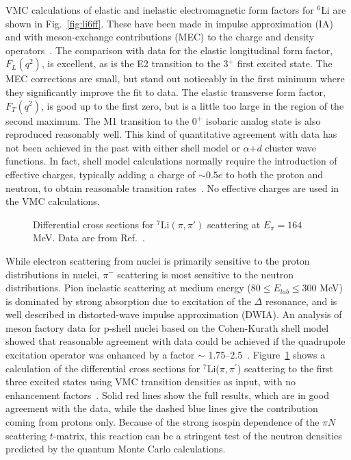 VMC calculations of elastic and inelastic electromagnetic form
factors for $^6$Li are shown in Fig.~\ref{fig:li6ff}.
These have been made in impulse approximation (IA) and with meson-exchange
contributions (MEC) to the charge and density operators~\cite{WS98}.
The comparison with data for the elastic longitudinal form factor, $F_L(q^2)$,
is excellent, as is the E2 transition to the 3$^+$ first excited state.
The MEC corrections are small, but stand out noticeably in the first minimum
where they significantly improve the fit to data.
The elastic transverse form factor, $F_T(q^2)$, is good up to the first zero,
but is a little too large in the region of the second maximum.
The M1 transition to the 0$^+$ isobaric analog state is also reproduced
reasonably well.
This kind of quantitative agreement with data has not been achieved in the
past with either shell model or $\alpha$+$d$ cluster wave functions.
In fact, shell model calculations normally require the introduction of 
effective charges, typically adding a charge of $\sim 0.5e$ to both the
proton and neutron, to obtain reasonable transition rates~\cite{PWK67}. 
No effective charges are used in the VMC calculations.

\begin{figure}
\centerline{}
\caption{Differential cross sections for $^7$Li$(\pi,\pi')$ scattering at
$E_\pi = 164$ MeV.  Data are from Ref.~\protect\cite{Bol79}.}
\label{fig:pipip}
\end{figure}

While electron scattering from nuclei is primarily sensitive to the proton
distributions in nuclei, $\pi^-$ scattering is most sensitive to the
neutron distributions.
Pion inelastic scattering at medium energy ($80 \leq E_{lab} \leq 300$ MeV) 
is dominated by strong absorption due to excitation of the $\Delta$ resonance,
and is well described in distorted-wave impulse approximation (DWIA).
An analysis of meson factory data for p-shell nuclei based on the Cohen-Kurath
shell model~\cite{CK65} showed that reasonable agreement with data 
could be achieved if the quadrupole excitation operator was enhanced 
by a factor $\sim$ 1.75--2.5~\cite{LK80}.
Figure~\ref{fig:pipip} shows a calculation of the differential cross sections
for $^7$Li($\pi,\pi^\prime$) scattering to the first three excited states
using VMC transition densities as input, with no enhancement 
factors~\cite{LW01}.
Solid red lines show the full results, which are in good agreement with the
data, while the dashed blue lines give the contribution coming from protons 
only.
Because of the strong isospin dependence of the $\pi N$ scattering $t$-matrix,
this reaction can be a stringent test of the neutron densities predicted
by the quantum Monte Carlo calculations.

